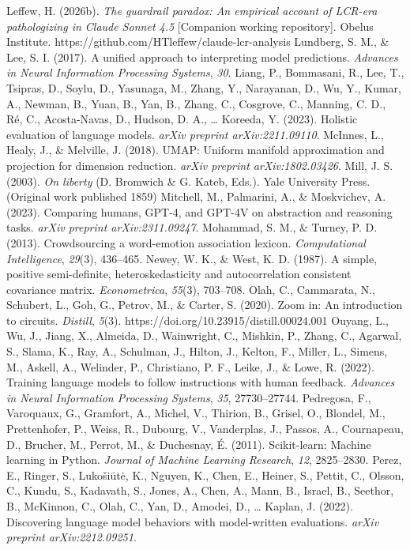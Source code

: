 \documentclass{obelus-preprint}
\begin{document}
Leffew, H. (2026b). \emph{The guardrail paradox: An empirical account of LCR-era pathologizing in Claude Sonnet 4.5} [Companion working repository]. Obelus Institute. https://github.com/HTleffew/claude-lcr-analysis
Lundberg, S. M., \& Lee, S. I. (2017). A unified approach to interpreting model predictions. \emph{Advances in Neural Information Processing Systems}, \emph{30}.
Liang, P., Bommasani, R., Lee, T., Tsipras, D., Soylu, D., Yasunaga, M., Zhang, Y., Narayanan, D., Wu, Y., Kumar, A., Newman, B., Yuan, B., Yan, B., Zhang, C., Cosgrove, C., Manning, C. D., Ré, C., Acosta-Navas, D., Hudson, D. A., \ldots{} Koreeda, Y. (2023). Holistic evaluation of language models. \emph{arXiv preprint arXiv:2211.09110}.
McInnes, L., Healy, J., \& Melville, J. (2018). UMAP: Uniform manifold approximation and projection for dimension reduction. \emph{arXiv preprint arXiv:1802.03426}.
Mill, J. S. (2003). \emph{On liberty} (D. Bromwich \& G. Kateb, Eds.). Yale University Press. (Original work published 1859)
Mitchell, M., Palmarini, A., \& Moskvichev, A. (2023). Comparing humans, GPT-4, and GPT-4V on abstraction and reasoning tasks. \emph{arXiv preprint arXiv:2311.09247}.
Mohammad, S. M., \& Turney, P. D. (2013). Crowdsourcing a word-emotion association lexicon. \emph{Computational Intelligence}, \emph{29}(3), 436--465.
Newey, W. K., \& West, K. D. (1987). A simple, positive semi-definite, heteroskedasticity and autocorrelation consistent covariance matrix. \emph{Econometrica}, \emph{55}(3), 703--708.
Olah, C., Cammarata, N., Schubert, L., Goh, G., Petrov, M., \& Carter, S. (2020). Zoom in: An introduction to circuits. \emph{Distill}, \emph{5}(3). https://doi.org/10.23915/distill.00024.001
Ouyang, L., Wu, J., Jiang, X., Almeida, D., Wainwright, C., Mishkin, P., Zhang, C., Agarwal, S., Slama, K., Ray, A., Schulman, J., Hilton, J., Kelton, F., Miller, L., Simens, M., Askell, A., Welinder, P., Christiano, P. F., Leike, J., \& Lowe, R. (2022). Training language models to follow instructions with human feedback. \emph{Advances in Neural Information Processing Systems}, \emph{35}, 27730--27744.
Pedregosa, F., Varoquaux, G., Gramfort, A., Michel, V., Thirion, B., Grisel, O., Blondel, M., Prettenhofer, P., Weiss, R., Dubourg, V., Vanderplas, J., Passos, A., Cournapeau, D., Brucher, M., Perrot, M., \& Duchesnay, É. (2011). Scikit-learn: Machine learning in Python. \emph{Journal of Machine Learning Research}, \emph{12}, 2825--2830.
Perez, E., Ringer, S., Lukošiūtė, K., Nguyen, K., Chen, E., Heiner, S., Pettit, C., Olsson, C., Kundu, S., Kadavath, S., Jones, A., Chen, A., Mann, B., Israel, B., Seethor, B., McKinnon, C., Olah, C., Yan, D., Amodei, D., \ldots{} Kaplan, J. (2022). Discovering language model behaviors with model-written evaluations. \emph{arXiv preprint arXiv:2212.09251}.
\end{document}
